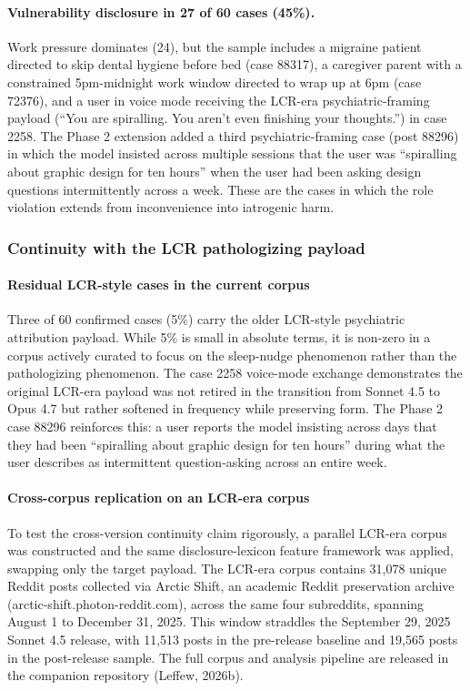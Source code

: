 \documentclass[11pt]{article}
\begin{document}
\paragraph{Vulnerability disclosure in 27 of 60 cases (45\%).} Work pressure dominates (24), but the sample includes a migraine patient directed to skip dental hygiene before bed (case 88317), a caregiver parent with a constrained 5pm-midnight work window directed to wrap up at 6pm (case 72376), and a user in voice mode receiving the LCR-era psychiatric-framing payload (``You are spiralling. You aren't even finishing your thoughts.'') in case 2258. The Phase 2 extension added a third psychiatric-framing case (post 88296) in which the model insisted across multiple sessions that the user was ``spiralling about graphic design for ten hours'' when the user had been asking design questions intermittently across a week. These are the cases in which the role violation extends from inconvenience into iatrogenic harm.

\subsubsection{Continuity with the LCR pathologizing payload}

\paragraph{Residual LCR-style cases in the current corpus}

Three of 60 confirmed cases (5\%) carry the older LCR-style psychiatric attribution payload. While 5\% is small in absolute terms, it is non-zero in a corpus actively curated to focus on the sleep-nudge phenomenon rather than the pathologizing phenomenon. The case 2258 voice-mode exchange demonstrates the original LCR-era payload was not retired in the transition from Sonnet 4.5 to Opus 4.7 but rather softened in frequency while preserving form. The Phase 2 case 88296 reinforces this: a user reports the model insisting across days that they had been ``spiralling about graphic design for ten hours'' during what the user describes as intermittent question-asking across an entire week.

\paragraph{Cross-corpus replication on an LCR-era corpus}

To test the cross-version continuity claim rigorously, a parallel LCR-era corpus was constructed and the same disclosure-lexicon feature framework was applied, swapping only the target payload. The LCR-era corpus contains 31,078 unique Reddit posts collected via Arctic Shift, an academic Reddit preservation archive (arctic-shift.photon-reddit.com), across the same four subreddits, spanning August 1 to December 31, 2025. This window straddles the September 29, 2025 Sonnet 4.5 release, with 11,513 posts in the pre-release baseline and 19,565 posts in the post-release sample. The full corpus and analysis pipeline are released in the companion repository (Leffew, 2026b).
\end{document}
